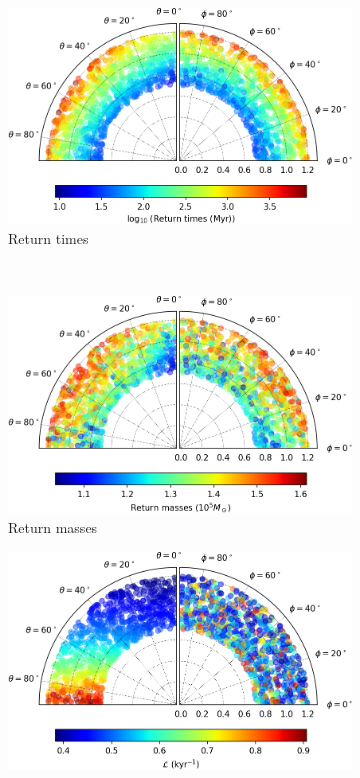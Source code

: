 \begin{figure}[h]
    \centering
    \begin{subfigure}[t]{0.4\textwidth}
        \includegraphics[width = \textwidth]{"../Files/Week 13/images/25_time"}
        \caption{Return times}
    \end{subfigure}
    ~ 
    \begin{subfigure}[t]{0.4\textwidth}
        \includegraphics[width=\textwidth]{"../Files/Week 13/images/25_mass"}
        \caption{Return masses}
    \end{subfigure}
    \begin{subfigure}[t]{0.4\textwidth}
        \includegraphics[width=\textwidth]{"../Files/Week 13/images/25_lyapunov"}

\end{subfigure}
\end{figure}
